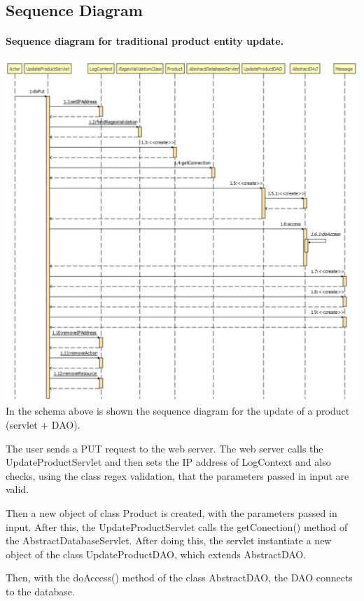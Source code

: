 \pagebreak
\subsection{Sequence Diagram}

\paragraph[]{Sequence diagram for traditional product entity update.} \hspace{1mm} \par
\includegraphics[width=\textwidth, keepaspectratio]{resources/updateproductsequence.pdf}
In the schema above is shown the sequence diagram for the update of a product (servlet + DAO). 

The user sends a PUT request to the web server. The web server calls the UpdateProductServlet and then sets the IP address of LogContext and also checks, using the class regex validation, that the parameters passed in input are valid.

Then a new object of class Product is created, with the parameters passed in input. After this, the UpdateProductServlet calls the getConection() method of the AbstractDatabaseServlet. After doing this, the servlet instantiate a new object of the class UpdateProductDAO, which extends AbstractDAO.

Then, with the doAccess() method of the class AbstractDAO, the DAO connects to the database.

